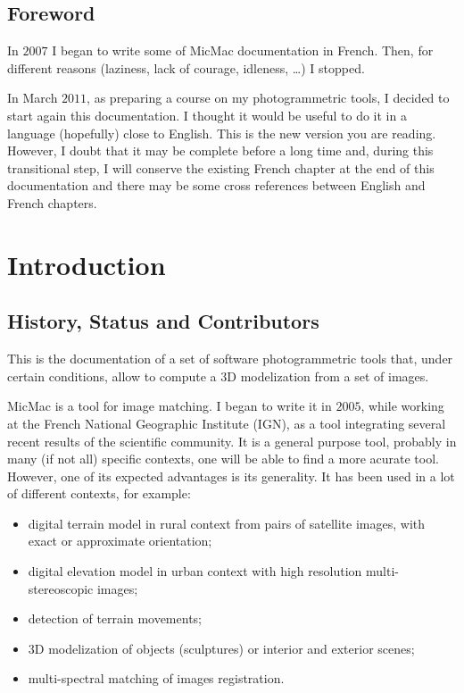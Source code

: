 \section{Foreword}
In $2007$ I began to write some of MicMac documentation in French. Then,
for different reasons (laziness, lack of courage, idleness, \dots) I stopped.

In March $2011$, as preparing a course on my photogrammetric tools, I decided
to start again this documentation. I thought it would be useful to
do it in a language (hopefully) close to English.  This is the new
version you are reading. However, I doubt that it may be complete before a long time and,
during this transitional step, I will conserve the existing French chapter at the end
of this documentation and there may be some cross references between English and French chapters.



\chapter{Introduction}


\section{History, Status and Contributors}

This is the documentation of a set of software 
photogrammetric tools that, under certain
conditions, allow to compute a 3D modelization from a
set of images.

MicMac is a tool for image matching. I began to write it in $2005$, while working at the
French National Geographic Institute (IGN), as
a tool integrating several recent results of the scientific community.
It is a general purpose tool, probably in many (if not all) specific
contexts, one will be able to find a more acurate tool. However, one
of its expected advantages is its generality. It has been used 
in a lot of different contexts, for example:

\begin{itemize}
   \item digital terrain model in rural context from pairs of satellite
         images, with exact or approximate orientation;

   \item digital elevation model in urban context with high resolution
         multi-stereoscopic images;

   \item detection of terrain movements;

   \item 3D modelization of objects (sculptures) or interior and exterior scenes;

   \item multi-spectral matching of images registration.
         
\end{itemize}

